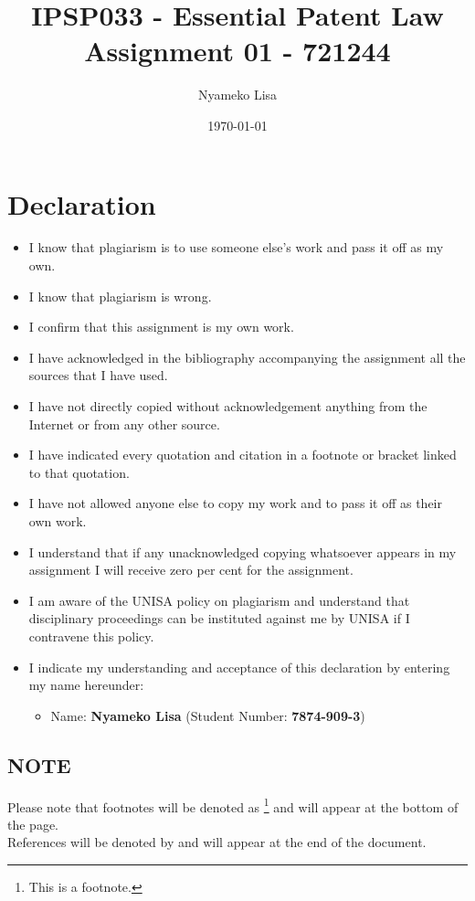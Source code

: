 \documentclass[11pt]{article}
\author{Nyameko Lisa}
\date{\today}
\title{IPSP033 - Essential Patent Law\\\medskip
\large Assignment 01 - 721244}
\begin{document}
\maketitle

\justifying
\section*{Declaration}
\label{sec:orgfda2168}
\begin{itemize}
\item I know that plagiarism is to use someone else’s work and pass it off as my own.
\item I know that plagiarism is wrong.
\item I confirm that this assignment is my own work.
\item I have acknowledged in the bibliography accompanying the assignment all the sources that I have used.
\item I have not directly copied without acknowledgement anything from the Internet or from any other source.
\item I have indicated every quotation and citation in a footnote or bracket linked to that quotation.
\item I have not allowed anyone else to copy my work and to pass it off as their own work.
\item I understand that if any unacknowledged copying whatsoever appears in my assignment I will receive zero per cent for the assignment.
\item I am aware of the UNISA policy on plagiarism and understand that disciplinary proceedings can be instituted against me by UNISA if I contravene this policy.
\item I indicate my understanding and acceptance of this declaration by
entering my name hereunder:
\begin{itemize}
\item Name: \textbf{Nyameko Lisa} (Student Number: \textbf{7874-909-3})
\end{itemize}
\end{itemize}

\subsection*{NOTE}
\label{sec:org2789cd9}
Please note that footnotes will be denoted as \footnote{This is a footnote.} and will
appear at the bottom of the page.\\
References will be denoted by \cite{rsa78_patents_act} and will appear at the end of the document.
\newpage
\end{document}
